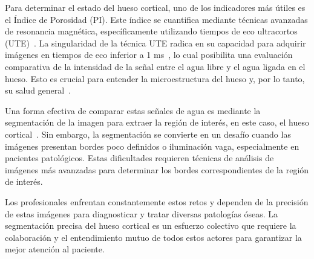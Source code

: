 \documentclass[conference]{IEEEtran}
\begin{document}
\noindent Para determinar el estado del hueso cortical, uno de los indicadores más útiles es el Índice de Porosidad (PI). Este índice se cuantifica mediante técnicas avanzadas de resonancia magnética, específicamente utilizando tiempos de eco ultracortos (UTE)~\cite{Jerban2023}. La singularidad de la técnica UTE radica en su capacidad para adquirir imágenes en tiempos de eco inferior a 1 ms~\cite{du2012evaluacion}, lo cual posibilita una evaluación comparativa de la intensidad de la señal entre el agua libre y el agua ligada en el hueso. Esto es crucial para entender la microestructura del hueso y, por lo tanto, su salud general~\cite{Surowiec2021,Jerban2023}.

\noindent Una forma efectiva de comparar estas señales de agua es mediante la segmentación de la imagen para extraer la región de interés, en este caso, el hueso cortical~\cite{segmentation_bandyopadhyay_2021}. Sin embargo, la segmentación se convierte en un desafío cuando las imágenes presentan bordes poco definidos o iluminación vaga, especialmente en pacientes patológicos. Estas dificultades requieren técnicas de análisis de imágenes más avanzadas para determinar los bordes correspondientes de la región de interés.


\noindent Los profesionales enfrentan constantemente estos retos y dependen de la precisión de estas imágenes para diagnosticar y tratar diversas patologías óseas. La segmentación precisa del hueso cortical es un esfuerzo colectivo que requiere la colaboración y el entendimiento mutuo de todos estos actores para garantizar la mejor atención al paciente.

\end{document}
